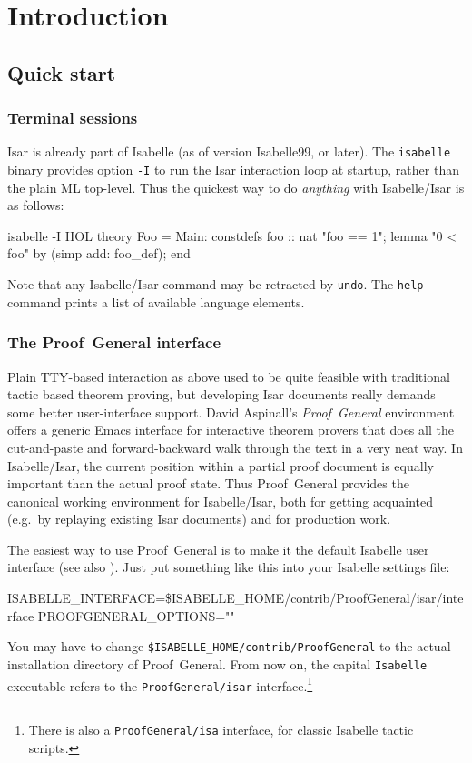 
\chapter{Introduction}

\section{Quick start}

\subsection{Terminal sessions}

Isar is already part of Isabelle (as of version Isabelle99, or later).  The
\texttt{isabelle} binary provides option \texttt{-I} to run the Isar
interaction loop at startup, rather than the plain ML top-level.  Thus the
quickest way to do \emph{anything} with Isabelle/Isar is as follows:
\begin{ttbox}
isabelle -I HOL\medskip
{}\medskip
theory Foo = Main:
constdefs foo :: nat  "foo == 1";
lemma "0 < foo" by (simp add: foo_def);
end
\end{ttbox}
Note that any Isabelle/Isar command may be retracted by \texttt{undo}.  The
\texttt{help} command prints a list of available language elements.


\subsection{The Proof~General interface}

Plain TTY-based interaction as above used to be quite feasible with
traditional tactic based theorem proving, but developing Isar documents really
demands some better user-interface support.  David Aspinall's
\emph{Proof~General} environment
\cite{proofgeneral,Aspinall:TACAS:2000} offers a generic Emacs interface for
interactive theorem provers that does all the cut-and-paste and
forward-backward walk through the text in a very neat way.  In Isabelle/Isar,
the current position within a partial proof document is equally important than
the actual proof state.  Thus Proof~General provides the canonical working
environment for Isabelle/Isar, both for getting acquainted (e.g.\ by replaying
existing Isar documents) and for production work.

\medskip

The easiest way to use Proof~General is to make it the default Isabelle user
interface (see also \cite{isabelle-sys}).  Just put something like this into
your Isabelle settings file:
\begin{ttbox}
ISABELLE_INTERFACE=\$ISABELLE_HOME/contrib/ProofGeneral/isar/interface
PROOFGENERAL_OPTIONS=""
\end{ttbox}
You may have to change \texttt{\$ISABELLE_HOME/contrib/ProofGeneral} to the
actual installation directory of Proof~General.  From now on, the capital
\texttt{Isabelle} executable refers to the \texttt{ProofGeneral/isar}
interface.\footnote{There is also a \texttt{ProofGeneral/isa} interface, for
  classic Isabelle tactic scripts.}

